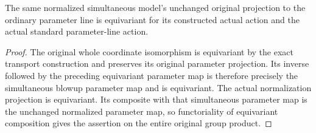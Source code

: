 \begin{theorem}
\label{thm:pl-original-normalized-parameter-equivariance}
\leanok
{}
The same normalized simultaneous model's unchanged original projection
to the ordinary parameter line is equivariant for its constructed actual
action and the actual standard parameter-line action.
\end{theorem}
\begin{proof}
The original whole coordinate isomorphism is equivariant by the exact
transport construction and preserves its original parameter projection.
Its inverse followed by the preceding equivariant parameter map is
therefore precisely the simultaneous blowup parameter map and is
equivariant. The actual normalization projection is equivariant. Its
composite with that simultaneous parameter map is the unchanged
normalized parameter map, so functoriality of equivariant composition
gives the assertion on the entire original group product.
\end{proof}
